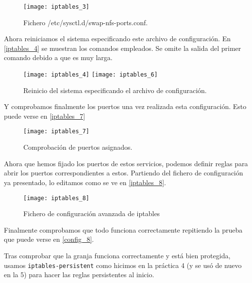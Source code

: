 \begin{figure}[h!]
\begin{center}
\caption{Fichero /etc/sysctl.d/swap-nfs-ports.conf.}
\label{iptables_3}
\texttt{[image: iptables\_3]}
\end{center}
\end{figure}

Ahora reiniciamos el sistema especificando este archivo de configuración. En \eqref{iptables_4} se muestran los comandos empleados. Se omite la salida del primer comando debido a que es muy larga.

\begin{figure}[h!]
\begin{center}
\caption{Reinicio del sistema especificando el archivo de configuración.}
\label{iptables_4}
\texttt{[image: iptables\_4]}
\texttt{[image: iptables\_6]}
\end{center}
\end{figure}

Y comprobamos finalmente los puertos una vez realizada esta configuración. Esto puede verse en \eqref{iptables_7}

\begin{figure}[h!]
\begin{center}
\caption{Comprobación de puertos asignados.}
\label{iptables_7}
\texttt{[image: iptables\_7]}
\end{center}
\end{figure}

Ahora que hemos fijado los puertos de estos servicios, podemos definir reglas para abrir los puertos correspondientes a estos. Partiendo del fichero de configuración ya presentado, lo editamos como se ve en \eqref{iptables_8}.

\begin{figure}[h!]
\begin{center}
\caption{Fichero de configuración avanzada de iptables}
\label{iptables_8}
\texttt{[image: iptables\_8]}
\end{center}
\end{figure}

Finalmente comprobamos que todo funciona correctamente repitiendo la prueba que puede verse en \eqref{config_8}.

Tras comprobar que la granja funciona correctamente y está bien protegida, usamos \verb|iptables-persistent| como hicimos en la práctica 4 (y se usó de nuevo en la 5) para hacer las reglas persistentes al inicio.



